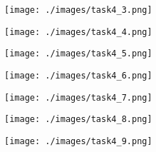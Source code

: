 \begin{figure}[!ht]
    \centering
    \texttt{[image: ./images/task4\_3.png]}
\end{figure}

\begin{figure}[!ht]
    \centering
    \texttt{[image: ./images/task4\_4.png]}
\end{figure}

\begin{figure}[!ht]
    \centering
    \texttt{[image: ./images/task4\_5.png]}
\end{figure}

\begin{figure}[!ht]
    \centering
    \texttt{[image: ./images/task4\_6.png]}
\end{figure}

\begin{figure}[!ht]
    \centering
    \texttt{[image: ./images/task4\_7.png]}
\end{figure}

\begin{figure}[!ht]
    \centering
    \texttt{[image: ./images/task4\_8.png]}
\end{figure}

\begin{figure}[!ht]
    \centering
    \texttt{[image: ./images/task4\_9.png]}
\end{figure}
